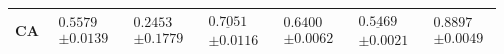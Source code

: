\begin{table}[!htbp]
\begin{tabular*}{\textwidth}{@{\extracolsep{\fill}}lcccccc@{}}
        \addlinespace[3pt]
        CA & $\begin{gathered}\mathbf{0.5579}\\[-2pt]\pm 0.0139\end{gathered}$ & $\begin{gathered}0.2453\\[-2pt]\pm 0.1779\end{gathered}$ & $\begin{gathered}\underline{0.7051}\\[-2pt]\pm 0.0116\end{gathered}$ & $\begin{gathered}\mathbf{0.6400}\\[-2pt]\pm 0.0062\end{gathered}$ & $\begin{gathered}\underline{0.5469}\\[-2pt]\pm 0.0021\end{gathered}$ & $\begin{gathered}0.8897\\[-2pt]\pm 0.0049\end{gathered}$ \\
        \bottomrule
    \end{tabular*}
\end{table}
